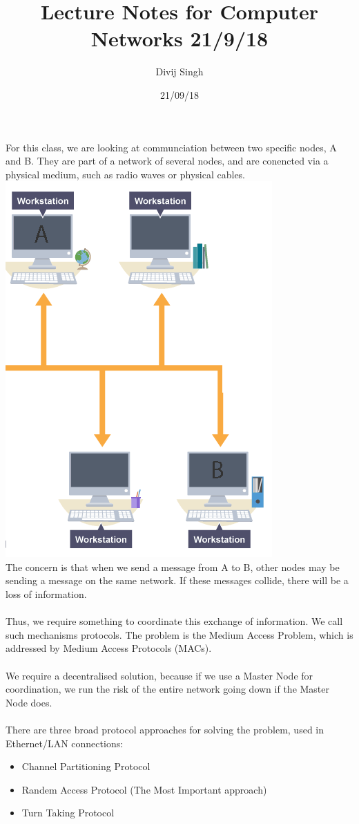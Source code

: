 \documentclass{article}
\title{Lecture Notes for Computer Networks 21/9/18}
\author{Divij Singh}
\date{21/09/18}
\begin{document}
	\maketitle
	For this class, we are looking at communciation between two specific nodes, A and B. They are part of a network of several nodes, and are conencted via a physical medium, such as radio waves or physical cables.\\

\includegraphics[scale=0.5]{scribe_diagram_1.png}\\

The concern is that when we send a message from A to B, other nodes may be sending a message on the same network. If these messages collide, there will be a loss of information.\\
\\
Thus, we require something to coordinate this exchange of information. We call such mechanisms protocols. The problem is the Medium Access Problem, which is addressed by Medium Access Protocols (MACs).\\
\\
We require a decentralised solution, because if we use a Master Node for coordination, we run the risk of the entire network going down if the Master Node does.\\
\\
There are three broad protocol approaches for solving the problem, used in Ethernet/LAN connections:\\
\begin{itemize}
\item Channel Partitioning Protocol
\item Randem Access Protocol (The Most Important approach)
\item Turn Taking Protocol
\end{itemize}
\end{document}
